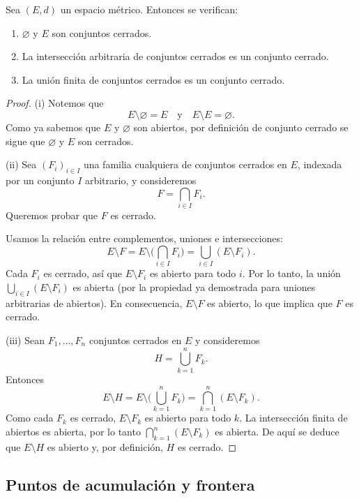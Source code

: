 \begin{prop}
Sea $(E,d)$ un espacio métrico. Entonces se verifican:
\begin{enumerate}[label=(\roman*)]
    \item $\varnothing$ y $E$ son conjuntos cerrados.
    \item La intersección arbitraria de conjuntos cerrados es un conjunto cerrado.
    \item La unión finita de conjuntos cerrados es un conjunto cerrado.
\end{enumerate}
\end{prop}

\begin{proof}
(i) Notemos que
\[
E \setminus \varnothing = E
\quad\text{y}\quad
E \setminus E = \varnothing.
\]
Como ya sabemos que $E$ y $\varnothing$ son abiertos, por definición
de conjunto cerrado se sigue que $\varnothing$ y $E$ son cerrados.

\medskip

(ii) Sea $(F_i)_{i\in I}$ una familia cualquiera de conjuntos cerrados
en $E$, indexada por un conjunto $I$ arbitrario, y consideremos
\[
F = \bigcap_{i\in I} F_i.
\]
Queremos probar que $F$ es cerrado.

Usamos la relación entre complementos, uniones e intersecciones:
\[
E \setminus F
= E \setminus \bigg(\bigcap_{i\in I} F_i\bigg)
= \bigcup_{i\in I} (E \setminus F_i).
\]
Cada $F_i$ es cerrado, así que $E \setminus F_i$ es abierto para todo $i$.
Por lo tanto, la unión $\bigcup_{i\in I} (E \setminus F_i)$ es abierta
(por la propiedad ya demostrada para uniones arbitrarias de abiertos).
En consecuencia, $E \setminus F$ es abierto, lo que implica que $F$
es cerrado.

\medskip

(iii) Sean $F_1,\dots,F_n$ conjuntos cerrados en $E$ y consideremos
\[
H = \bigcup_{k=1}^n F_k.
\]
Entonces
\[
E \setminus H
= E \setminus \bigg(\bigcup_{k=1}^n F_k\bigg)
= \bigcap_{k=1}^n (E \setminus F_k).
\]
Como cada $F_k$ es cerrado, $E \setminus F_k$ es abierto para todo $k$.
La intersección finita de abiertos es abierta, por lo tanto
$\bigcap_{k=1}^n (E \setminus F_k)$ es abierta. De aquí se deduce
que $E \setminus H$ es abierto y, por definición, $H$ es cerrado.
\end{proof}

\subsection{Puntos de acumulación y frontera}

